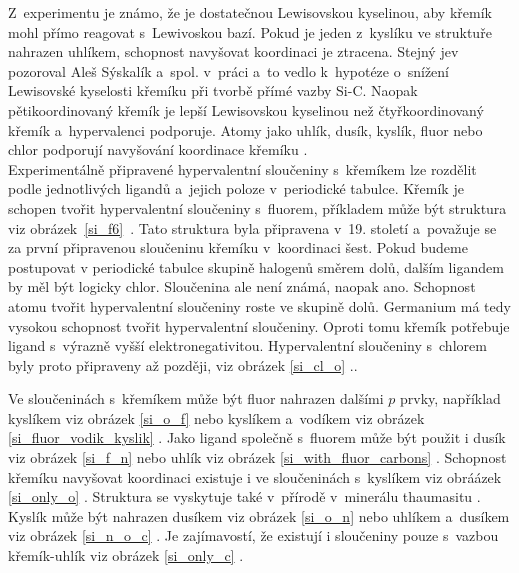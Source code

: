 \documentclass[
digital, %
table,   %
nolof,     %
nolot,     %
oneside,
]{fithesis3}
\begin{document}
Z~experimentu je známo, že  je dostatečnou Lewisovskou kyselinou, aby křemík mohl přímo reagovat s~Lewivoskou bazí. Pokud je jeden z~kyslíku ve struktuře nahrazen uhlíkem, schopnost navyšovat koordinaci je ztracena. Stejný jev pozoroval Aleš Sýskalík a~spol. v~práci \cite{Styskalik2015thesis} a~to vedlo k~hypotéze o~snížení Lewisovské kyselosti křemíku při tvorbě přímé vazby Si-C. Naopak pětikoordinovaný křemík je lepší Lewisovskou kyselinou než čtyřkoordinovaný křemík a~hypervalenci podporuje. Atomy jako uhlík, dusík, kyslík, fluor nebo chlor podporují navyšování koordinace křemíku \cite{Wagler2014}.\\

Experimentálně připravené hypervalentní sloučeniny s~křemíkem lze rozdělit podle jednotlivých ligandů a~jejich poloze v~periodické tabulce. Křemík je schopen tvořit hypervalentní sloučeniny s~fluorem, příkladem může být struktura   viz obrázek~\ref{si_f6}~\cite{memoriesphysiquelussac}. Tato struktura byla připravena v~19. století a~považuje se za první připravenou sloučeninu křemíku v~koordinaci šest. Pokud budeme postupovat v periodické tabulce skupině halogenů směrem dolů, dalším ligandem by měl být logicky chlor. Sloučenina  ale není známá, naopak  ano. Schopnost atomu tvořit hypervalentní sloučeniny roste ve skupině dolů. Germanium má tedy vysokou schopnost tvořit hypervalentní sloučeniny. Oproti tomu křemík potřebuje ligand s~výrazně vyšší elektronegativitou. Hypervalentní sloučeniny s~chlorem byly proto připraveny až později, viz obrázek \ref{si_cl_o} \cite{LAZAREV199716}..

Ve sloučeninách s~křemíkem může být fluor nahrazen dalšími $p$ prvky, například kyslíkem viz obrázek \ref{si_o_f} \cite{C0DT01115K} nebo kyslíkem a~vodíkem viz obrázek \ref{si_fluor_vodik_kyslik} \cite{BOYER19812165}.
Jako ligand společně s~fluorem může být použit i dusík viz obrázek \ref{si_f_n} \cite{C0DT01115K} nebo uhlík viz obrázek \ref{si_with_fluor_carbons} \cite{kremikfluorcarbon}. Schopnost křemíku navyšovat koordinaci existuje i ve sloučeninách s~kyslíkem viz obráázek \ref{si_only_o} \cite{flyn1969}.  Struktura  se vyskytuje také v~přírodě v~minerálu thaumasitu \cite{Edge:a08100}. Kyslík může být nahrazen dusíkem  viz obrázek \ref{si_o_n} \cite{Wagler2014} nebo uhlíkem a~dusíkem viz obrázek \ref{si_n_o_c} \cite{Wagler2014}. Je zajímavostí, že existují i sloučeniny pouze s~vazbou křemík-uhlík viz obrázek \ref{si_only_c} \cite{A901953G} \cite{Wagler2014}.
\end{document}
